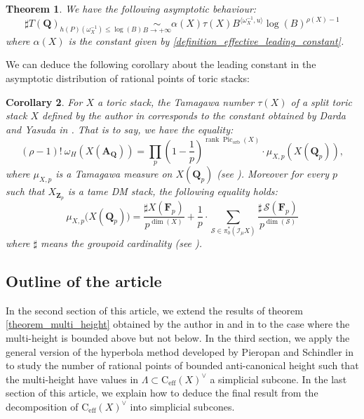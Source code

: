 \documentclass{proc-l}
\newcommand{\Z}{\mathbf{Z}}
\newcommand{\Q}{\mathbf{Q}}
\newcommand{\F}{\mathbf{F}}
\newcommand{\cone}{\text{C}_{\text{eff}}(X)}
\DeclareMathOperator{\Pic}{Pic}
\DeclareMathOperator{\rank}{rank}
\DeclareMathOperator{\orb}{orb}
\newcommand{\stackS}{\mathcal{S}}
\newcommand{\affine}{\mathbf{A}}
\newcommand{\sheafI}{\mathcal{I}}
\newcommand{\w}{\omega}
\newcommand{\twistsector}{\pi_0^*(\sheafI_{\mu} X)}
\newtheorem{theorem}{Theorem}[section]
\newtheorem{cor}[theorem]{Corollary}
\theoremstyle{definition}
\theoremstyle{remark}
\numberwithin{equation}{section}
\begin{document}
\begin{theorem}\label{theorem_article}
    We have the following asymptotic behaviour: $$\sharp T(\Q)_{h(P)(\w_X^{-1}) \leqslant \log(B)}   \underset{B \rightarrow +\infty}{\sim} \alpha(X) \tau(X) B^{\langle \w_{X}^{-1},u \rangle} \log(B)^{\rho(X) - 1} $$where $\alpha(X)$ is the constant given by \ref{definition_effective_leading_constant}.
\end{theorem}

We can deduce the following corollary about the leading constant in the asymptotic distribution of rational points of toric stacks:

\begin{cor}
    For $X$ a toric stack, the Tamagawa number $\tau(X)$ of a split toric stack $X$ defined by the author in \cite[Definition 6.51]{bongiorno_toric_stacks} corresponds to the constant obtained by Darda and Yasuda in \cite[Theorem 4.4.4]{darda_yasuda_toric_stacks_batyrev}. That is to say, we have the equality:
$$(\rho - 1)! \ \w_H(X(\affine_{\Q})) = \prod_{p}
\left( 1 - \frac{1}{p} \right)^{\rank \Pic_{\orb}(X)}
\cdot
\mu_{X,p}(X(\Q_p)),
$$ where $\mu_{X,p}$ is a Tamagawa measure on $X(\Q_p)$ (see \cite[Definition 6.46]{bongiorno_toric_stacks}). Moreover for every $p$ such that $X_{\Z_p}$ is a tame DM stack, the following equality holds:
\[
\mu_{X,p}\bigl(X(\Q_p)\bigr)
= \frac{\sharp X(\F_p)}{p^{\dim(X)}}  + \frac{1}{p} \cdot
\sum\limits_{\stackS \in \twistsector} 
\frac{\sharp\, \stackS\!\left(\F_p\right)}{p^{\dim(\stackS)}}
\]where $\sharp$ means the groupoid cardinality (see \cite[Theorem 6.52]{bongiorno_toric_stacks}).
\end{cor}






\subsection{Outline of the article}

In the second section of this article, we extend the results of theorem \ref{theorem_multi_height} obtained by the author in \cite{bongiorno2024multiheightanalysisrationalpoints} and in \cite{bongiorno_toric_stacks} to the case where the multi-height is bounded above but not below. In the third section, we apply the general version of the hyperbola method developed by Pieropan and Schindler in \cite[Theorem 1.1]{pieropan_hyperbola_method} to study the number of rational points of bounded anti-canonical height such that the multi-height have values in $\Lambda \subset \cone^{\vee}$ a simplicial subcone. In the last section of this article, we explain how to deduce the final result from the decomposition of $\cone^{\vee}$ into simplicial subcones.
\end{document}
